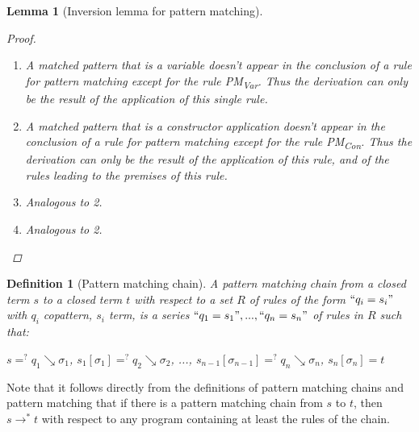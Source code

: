 \documentclass[11pt]{article} %
\newtheorem{lemma}{Lemma}
\newtheorem{definition}{Definition}
\begin{document}
\begin{lemma}[Inversion lemma for pattern matching]
\begin{proof}
\begin{enumerate}
\item A matched pattern that is a variable doesn't appear in the conclusion of a rule for pattern matching except for the rule PM\textsubscript{Var}. Thus the derivation can only be the result of the application of this single rule.

\item A matched pattern that is a constructor application doesn't appear in the conclusion of a rule for pattern matching except for the rule PM\textsubscript{Con}. Thus the derivation can only be the result of the application of this rule, and of the rules leading to the premises of this rule.

\item Analogous to 2.

\item Analogous to 2.

\end{enumerate}

\end{proof}

\end{lemma}

\begin{definition}[Pattern matching chain] A pattern matching chain from a closed term $s$ to a closed term $t$ with respect to a set $R$ of rules of the form $`` q_i = s_i "$ with $q_i$ copattern, $s_i$ term, is a series $`` q_1 = s_1 ", ..., `` q_n = s_n "$ of rules in $R$ such that:

$s =^? q_1 \searrow \sigma_1$, $s_1[\sigma_1] =^? q_2 \searrow \sigma_2$, ..., $s_{n-1}[\sigma_{n-1}] =^? q_n \searrow \sigma_n$, $s_n[\sigma_n] = t$

\end{definition}

Note that it follows directly from the definitions of pattern matching chains and pattern matching that if there is a pattern matching chain from $s$ to $t$, then $s \longrightarrow^* t$ with respect to any program containing at least the rules of the chain.
\end{document}

